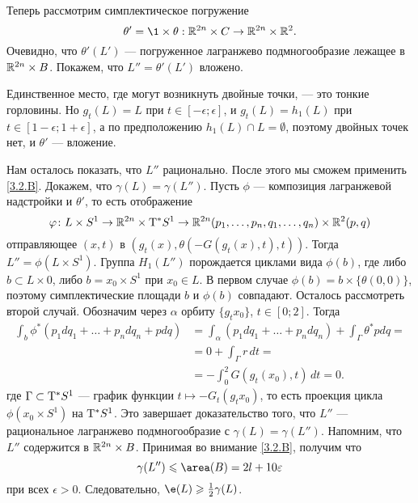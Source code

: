 Теперь рассмотрим симплектическое погружение 
\[\theta' = \1 \times \theta: \RR^{2n} \times C \to \RR^{2n} \times \RR^2.\]
Очевидно, что $\theta' (L')$ — погруженное лагранжево подмногообразие лежащее в $\mathbb{R}^{2n} \times B$. 
Покажем, что $L'' = \theta' (L')$ вложено.

Единственное место, где могут возникнуть двойные точки, — это тонкие горловины.
Но $g_t (L) = L$ при $t \in [-\epsilon;\epsilon]$, 
и $g_t (L) = h_1 (L)$ при $t \in [1 - \epsilon;1 + \epsilon]$, а по предположению $h_1 (L) \cap L = \emptyset$, поэтому двойных точек нет, и $\theta'$ — вложение.

Нам осталось показать, что $L''$ рационально.
После этого мы сможем применить \ref{3.2.B}.
Докажем, что $\gamma (L) = \gamma (L'')$.
Пусть $\phi$ — композиция лагранжевой надстройки и $\theta'$,
то есть отображение 
\[\varphi\colon 
L \times S^1
\to
\mathbb{R}^{2n} \times \mathrm{T}^\ast S^1
\to
\mathbb{R}^{2n} (p_1,\dots, p_n, q_1,\dots, q_n) \times \mathbb{R}^2 (p, q)\]
отправляющее $(x, t)$ в $(g_t (x), \theta (-G (g_t (x), t), t))$.
Тогда $L''=\phi(L \times S^1)$.
Группа $H_1 (L'')$ порождается циклами вида $\phi (b)$, где либо $b \subset L \times {0}$, либо $b = {x_0} \times S^1$ при $x_0 \in L$.
В первом случае $\phi (b) = b \times \{\theta (0, 0)\}$, поэтому симплектические площади $b$ и $\phi (b)$ совпадают.
Осталось рассмотреть второй случай.
Обозначим через $\alpha$ орбиту $\{g_t x_0\}$, $t \in [0; 2]$.
Тогда
\begin{align*}
\int_b\phi^\ast (p_1 dq_1 +\dots
+ p_n dq_n + pdq)
&= \int_\alpha (p_1 dq_1 +\dots
+ p_n dq_n) + \int_{\Gamma}\theta^\ast pdq =
\\
&= 0 + \int_{\Gamma} r\,dt =
\\
&= - \int_0^2G (g_t (x_0), t)\,dt 
= 0.
\end{align*}
где $\Gamma\subset \mathrm{T}^\ast S^{1}$  — график функции $t\mapsto -G_{t}(g_{t}x_{0})$, то есть проекция цикла $\phi(x_{0}\times S^{1})$ на $\mathrm{T}^\ast S^{1}$.
Это завершает доказательство того, что $L''$ — рациональное лагранжево подмногообразие с $\gamma (L) = \gamma (L'')$.
Напомним, что $L''$ содержится в $\mathbb{R}^{2n} \times B$.
Принимая во внимание \ref{3.2.B}, получим что
\[\gamma (L'') \le \area (B) = 2l + 10\epsilon\]
при всех $\epsilon> 0$.
Следовательно, $\e(L) \ge \tfrac12 \gamma (L)$.
\qeds

